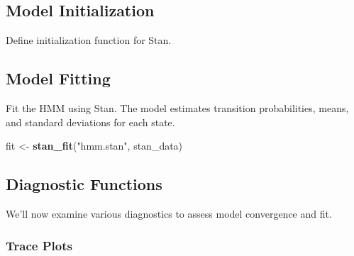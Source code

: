 \documentclass[
]{article}
\newenvironment{Shaded}{\begin{snugshade}}{\end{snugshade}}
\newcommand{\AttributeTok}[1]{\textcolor[rgb]{0.13,0.29,0.53}{#1}}
\newcommand{\ControlFlowTok}[1]{\textcolor[rgb]{0.13,0.29,0.53}{\textbf{#1}}}
\newcommand{\DecValTok}[1]{\textcolor[rgb]{0.00,0.00,0.81}{#1}}
\newcommand{\FunctionTok}[1]{\textcolor[rgb]{0.13,0.29,0.53}{\textbf{#1}}}
\newcommand{\NormalTok}[1]{#1}
\newcommand{\OtherTok}[1]{\textcolor[rgb]{0.56,0.35,0.01}{#1}}
\newcommand{\SpecialCharTok}[1]{\textcolor[rgb]{0.81,0.36,0.00}{\textbf{#1}}}
\newcommand{\StringTok}[1]{\textcolor[rgb]{0.31,0.60,0.02}{#1}}
\begin{document}
\subsection{Model Initialization}\label{model-initialization}

Define initialization function for Stan.

\begin{Shaded}
\end{Shaded}

\subsection{Model Fitting}\label{model-fitting}

Fit the HMM using Stan. The model estimates transition probabilities,
means, and standard deviations for each state.

\begin{Shaded}
\begin{Highlighting}[]
\NormalTok{fit }\OtherTok{\textless{}{-}} \FunctionTok{stan\_fit}\NormalTok{(}\StringTok{"hmm.stan"}\NormalTok{, stan\_data)}
\end{Highlighting}
\end{Shaded}

\subsection{Diagnostic Functions}\label{diagnostic-functions}

We'll now examine various diagnostics to assess model convergence and
fit.

\subsubsection{Trace Plots}\label{trace-plots}
\end{document}
